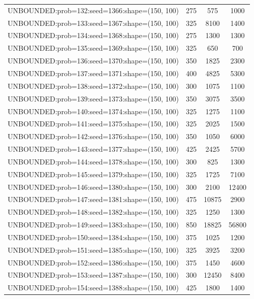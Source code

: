 \begin{longtable}{lccc}
UNBOUNDED:prob=132:seed=1366:shape=(150, 100) &      275 &   575 &   1000 \\
UNBOUNDED:prob=133:seed=1367:shape=(150, 100) &      325 &  8100 &   1400 \\
UNBOUNDED:prob=134:seed=1368:shape=(150, 100) &      275 &  1300 &   1300 \\
UNBOUNDED:prob=135:seed=1369:shape=(150, 100) &      325 &   650 &    700 \\
UNBOUNDED:prob=136:seed=1370:shape=(150, 100) &      350 &  1825 &   2300 \\
UNBOUNDED:prob=137:seed=1371:shape=(150, 100) &      400 &  4825 &   5300 \\
UNBOUNDED:prob=138:seed=1372:shape=(150, 100) &      300 &  1075 &   1100 \\
UNBOUNDED:prob=139:seed=1373:shape=(150, 100) &      350 &  3075 &   3500 \\
UNBOUNDED:prob=140:seed=1374:shape=(150, 100) &      325 &  1275 &   1100 \\
UNBOUNDED:prob=141:seed=1375:shape=(150, 100) &      325 &  2025 &   1500 \\
UNBOUNDED:prob=142:seed=1376:shape=(150, 100) &      350 &  1050 &   6000 \\
UNBOUNDED:prob=143:seed=1377:shape=(150, 100) &      425 &  2425 &   5700 \\
UNBOUNDED:prob=144:seed=1378:shape=(150, 100) &      300 &   825 &   1300 \\
UNBOUNDED:prob=145:seed=1379:shape=(150, 100) &      325 &  1725 &   7100 \\
UNBOUNDED:prob=146:seed=1380:shape=(150, 100) &      300 &  2100 &  12400 \\
UNBOUNDED:prob=147:seed=1381:shape=(150, 100) &      475 & 10875 &   2900 \\
UNBOUNDED:prob=148:seed=1382:shape=(150, 100) &      325 &  1250 &   1300 \\
UNBOUNDED:prob=149:seed=1383:shape=(150, 100) &      850 & 18825 &  56800 \\
UNBOUNDED:prob=150:seed=1384:shape=(150, 100) &      375 &  1025 &   1200 \\
UNBOUNDED:prob=151:seed=1385:shape=(150, 100) &      325 &  3925 &   3200 \\
UNBOUNDED:prob=152:seed=1386:shape=(150, 100) &      375 &  1450 &   4600 \\
UNBOUNDED:prob=153:seed=1387:shape=(150, 100) &      300 & 12450 &   8400 \\
UNBOUNDED:prob=154:seed=1388:shape=(150, 100) &      425 &  1800 &   1400 \\

\end{longtable}
